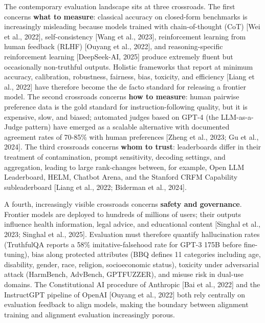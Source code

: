 The contemporary evaluation landscape sits at three crossroads. The first concerns \textbf{what to measure}: classical accuracy on closed-form benchmarks is increasingly misleading because models trained with chain-of-thought (CoT) {[}Wei et al., 2022{]}, self-consistency {[}Wang et al., 2023{]}, reinforcement learning from human feedback (RLHF) {[}Ouyang et al., 2022{]}, and reasoning-specific reinforcement learning {[}DeepSeek-AI, 2025{]} produce extremely fluent but occasionally non-truthful outputs. Holistic frameworks that report at minimum accuracy, calibration, robustness, fairness, bias, toxicity, and efficiency {[}Liang et al., 2022{]} have therefore become the de facto standard for releasing a frontier model. The second crossroads concerns \textbf{how to measure}: human pairwise preference data is the gold standard for instruction-following quality, but it is expensive, slow, and biased; automated judges based on GPT-4 (the LLM-as-a-Judge pattern) have emerged as a scalable alternative with documented agreement rates of 70-85\% with human preferences {[}Zheng et al., 2023; Gu et al., 2024{]}. The third crossroads concerns \textbf{whom to trust}: leaderboards differ in their treatment of contamination, prompt sensitivity, decoding settings, and aggregation, leading to large rank-changes between, for example, Open LLM Leaderboard, HELM, Chatbot Arena, and the Stanford CRFM Capability subleaderboard {[}Liang et al., 2022; Biderman et al., 2024{]}.

A fourth, increasingly visible crossroads concerns \textbf{safety and governance}. Frontier models are deployed to hundreds of millions of users; their outputs influence health information, legal advice, and educational content {[}Singhal et al., 2023; Singhal et al., 2025{]}. Evaluation must therefore quantify hallucination rates (TruthfulQA reports a 58\% imitative-falsehood rate for GPT-3 175B before fine-tuning), bias along protected attributes (BBQ defines 11 categories including age, disability, gender, race, religion, socioeconomic status), toxicity under adversarial attack (HarmBench, AdvBench, GPTFUZZER), and misuse risk in dual-use domains. The Constitutional AI procedure of Anthropic {[}Bai et al., 2022{]} and the InstructGPT pipeline of OpenAI {[}Ouyang et al., 2022{]} both rely centrally on evaluation feedback to align models, making the boundary between alignment training and alignment evaluation increasingly porous.

